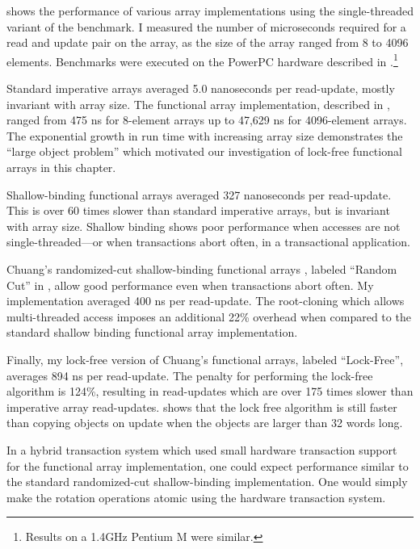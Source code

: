  shows the performance of various array
implementations using the single-threaded variant of the benchmark.
I measured the number of microseconds required for a read and update pair
on the array, as the size of the array ranged from 8 to 4096 elements.
Benchmarks were executed on the PowerPC hardware described in
.\footnote{Results on a 1.4GHz Pentium M were similar.}

Standard imperative arrays averaged 5.0 nanoseconds per read-update,
mostly invariant with array size.  The \naive functional array
implementation, described in , ranged from 475 ns
for 8-element arrays up to 47,629 ns for 4096-element arrays.  The
exponential growth in run time with increasing array size demonstrates the
``large object problem'' which motivated our investigation of
lock-free functional arrays in this chapter.

Shallow-binding functional arrays \cite{Baker91} averaged 327
nanoseconds per read-update.  This is over 60 times slower than
standard imperative arrays, but is invariant with array size.
Shallow binding shows poor performance when accesses are not
single-threaded---or when transactions abort often, in a transactional
application.

Chuang's randomized-cut shallow-binding functional arrays
\cite{Chuang94}, labeled ``Random Cut'' in ,
allow good performance even when transactions abort
often.  My implementation averaged 400 ns per read-update.  The
root-cloning which allows multi-threaded access imposes an additional
22\% overhead when compared to the standard shallow binding functional
array implementation.

Finally, my lock-free version of Chuang's functional arrays, labeled
``Lock-Free'', averages
894 ns per read-update.  The penalty for performing the lock-free
algorithm is 124\%, resulting in read-updates which are over 175 times slower
than imperative array read-updates.    shows
that the lock free algorithm is still faster than copying objects on
update when the objects are larger than 32 words long.

In a hybrid transaction system which used small hardware transaction
support for the functional array implementation, one could expect
performance similar to the standard randomized-cut shallow-binding
implementation.  One would simply make the rotation operations atomic
using the hardware transaction system.



